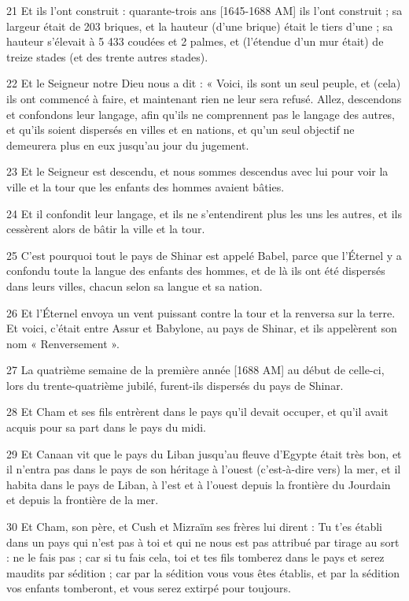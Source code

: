 \par 21 Et ils l'ont construit : quarante-trois ans [1645-1688 AM] ils l'ont construit ; sa largeur était de 203 briques, et la hauteur (d'une brique) était le tiers d'une ; sa hauteur s'élevait à 5 433 coudées et 2 palmes, et (l'étendue d'un mur était) de treize stades (et des trente autres stades).
\par 22 Et le Seigneur notre Dieu nous a dit : « Voici, ils sont un seul peuple, et (cela) ils ont commencé à faire, et maintenant rien ne leur sera refusé. Allez, descendons et confondons leur langage, afin qu'ils ne comprennent pas le langage des autres, et qu'ils soient dispersés en villes et en nations, et qu'un seul objectif ne demeurera plus en eux jusqu'au jour du jugement.
\par 23 Et le Seigneur est descendu, et nous sommes descendus avec lui pour voir la ville et la tour que les enfants des hommes avaient bâties.
\par 24 Et il confondit leur langage, et ils ne s'entendirent plus les uns les autres, et ils cessèrent alors de bâtir la ville et la tour.
\par 25 C'est pourquoi tout le pays de Shinar est appelé Babel, parce que l'Éternel y a confondu toute la langue des enfants des hommes, et de là ils ont été dispersés dans leurs villes, chacun selon sa langue et sa nation.
\par 26 Et l'Éternel envoya un vent puissant contre la tour et la renversa sur la terre. Et voici, c'était entre Assur et Babylone, au pays de Shinar, et ils appelèrent son nom « Renversement ».
\par 27 La quatrième semaine de la première année [1688 AM] au début de celle-ci, lors du trente-quatrième jubilé, furent-ils dispersés du pays de Shinar.
\par 28 Et Cham et ses fils entrèrent dans le pays qu'il devait occuper, et qu'il avait acquis pour sa part dans le pays du midi.
\par 29 Et Canaan vit que le pays du Liban jusqu'au fleuve d'Egypte était très bon, et il n'entra pas dans le pays de son héritage à l'ouest (c'est-à-dire vers) la mer, et il habita dans le pays de Liban, à l’est et à l’ouest depuis la frontière du Jourdain et depuis la frontière de la mer.
\par 30 Et Cham, son père, et Cush et Mizraïm ses frères lui dirent : Tu t'es établi dans un pays qui n'est pas à toi et qui ne nous est pas attribué par tirage au sort : ne le fais pas ; car si tu fais cela, toi et tes fils tomberez dans le pays et serez maudits par sédition ; car par la sédition vous vous êtes établis, et par la sédition vos enfants tomberont, et vous serez extirpé pour toujours.
